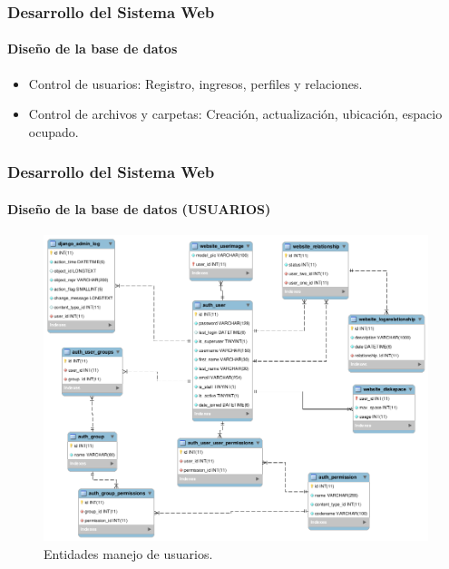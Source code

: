 \documentclass[spanish,xcolor=dvipsnames]{beamer}
\begin{document}
    \begin{frame}
    	\frametitle{Desarrollo del Sistema Web}
    	\framesubtitle{Diseño de la base de datos}
    	
    	\begin{itemize}
    		\item Control de usuarios: Registro, ingresos, perfiles y relaciones.
    		\item Control de archivos y carpetas: Creación, actualización, ubicación, espacio ocupado.
    	\end{itemize}
    	
    \end{frame}
    \begin{frame}
    	\frametitle{Desarrollo del Sistema Web}
    	\framesubtitle{Diseño de la base de datos (USUARIOS)}
    	
    	\begin{figure}[H]
    		\centering
    		\includegraphics[scale=0.25]{img/usuariosDB.png}
    		\caption{Entidades manejo de usuarios.}
    		\label{entidadRelacionUsuarios}
    	\end{figure}
    	
    \end{frame}
\end{document}
